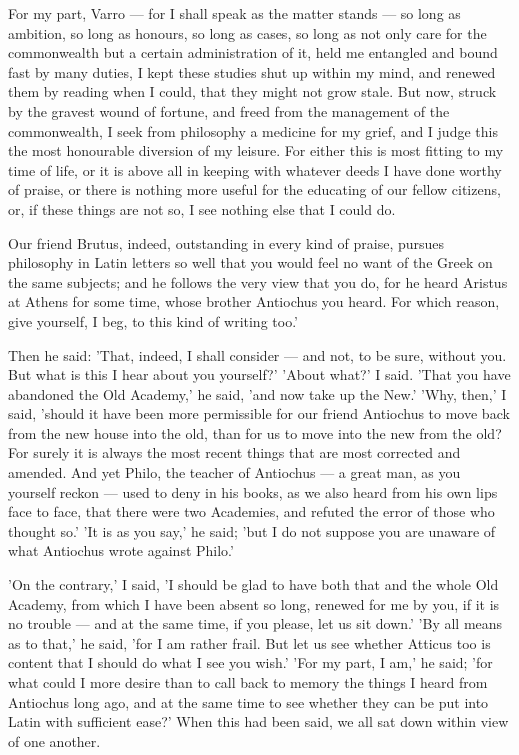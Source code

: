  For my part, Varro — for I shall speak as the matter stands — so long as ambition, so long as honours, so long as cases, so long as not only care for the commonwealth but a certain administration of it, held me entangled and bound fast by many duties, I kept these studies shut up within my mind, and renewed them by reading when I could, that they might not grow stale. But now, struck by the gravest wound of fortune, and freed from the management of the commonwealth, I seek from philosophy a medicine for my grief, and I judge this the most honourable diversion of my leisure. For either this is most fitting to my time of life, or it is above all in keeping with whatever deeds I have done worthy of praise, or there is nothing more useful for the educating of our fellow citizens, or, if these things are not so, I see nothing else that I could do.

 Our friend Brutus, indeed, outstanding in every kind of praise, pursues philosophy in Latin letters so well that you would feel no want of the Greek on the same subjects; and he follows the very view that you do, for he heard Aristus at Athens for some time, whose brother Antiochus you heard. For which reason, give yourself, I beg, to this kind of writing too.'

 Then he said: 'That, indeed, I shall consider — and not, to be sure, without you. But what is this I hear about you yourself?' 'About what?' I said. 'That you have abandoned the Old Academy,' he said, 'and now take up the New.' 'Why, then,' I said, 'should it have been more permissible for our friend Antiochus to move back from the new house into the old, than for us to move into the new from the old? For surely it is always the most recent things that are most corrected and amended. And yet Philo, the teacher of Antiochus — a great man, as you yourself reckon — used to deny in his books, as we also heard from his own lips face to face, that there were two Academies, and refuted the error of those who thought so.' 'It is as you say,' he said; 'but I do not suppose you are unaware of what Antiochus wrote against Philo.'

 'On the contrary,' I said, 'I should be glad to have both that and the whole Old Academy, from which I have been absent so long, renewed for me by you, if it is no trouble — and at the same time, if you please, let us sit down.' 'By all means as to that,' he said, 'for I am rather frail. But let us see whether Atticus too is content that I should do what I see you wish.' 'For my part, I am,' he said; 'for what could I more desire than to call back to memory the things I heard from Antiochus long ago, and at the same time to see whether they can be put into Latin with sufficient ease?' When this had been said, we all sat down within view of one another.

